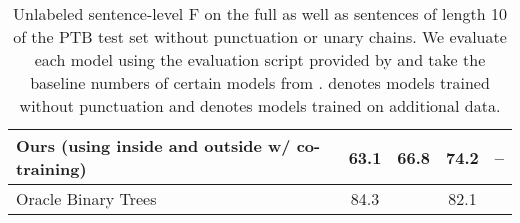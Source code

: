\documentclass[11pt]{article}
\begin{document}
\begin{table}[t]
{\begin{tabular}{lcccc}
    \multicolumn{1}{l}{Ours\textsuperscript{} (using inside and outside w/ co-training)} & \cellcolor{pearDark!20}\textbf{63.1} & \cellcolor{pearDark!20}66.8 & \cellcolor{pearDark!20}\textbf{74.2} & --\\
    \midrule
    \multicolumn{1}{l}{Oracle Binary Trees} & 84.3 & & 82.1 & \\
    \bottomrule
    \end{tabular}
    }
    \caption[Results on the PTB test set]{Unlabeled sentence-level F on the full as well as sentences of length  10 of the PTB test set without punctuation or unary chains. We evaluate each model using the evaluation script provided by \citet{kim-etal-2019-compound} and take the baseline numbers of certain models from \citep{kim-etal-2019-compound, cao-etal-2020-unsupervised}.
    {\textdagger} denotes models trained without punctuation and  denotes models trained on additional data.}
    \label{tab:ptb-results}
\end{table} \begin{table}[t]
   \centering
\end{table}
\end{document}
